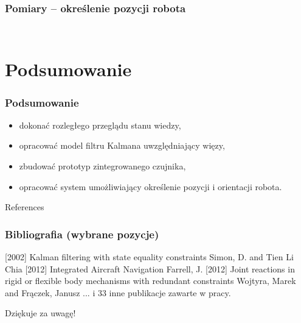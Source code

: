 \documentclass[aspectratio=169]{beamer}  %
\begin{document}
\begin{frame}
	\frametitle{Pomiary -- określenie pozycji robota \href{run:movies/position_test.mp4}{}}
	\begin{columns}
		\begin{column}{0.5\textwidth}
			\begin{figure}
				\centering
			\end{figure}
		\end{column}
		\begin{column}{0.5\textwidth}
			\begin{figure}
				\centering
			\end{figure}
		\end{column}
	\end{columns}
\end{frame}

\section{Podsumowanie}

\begin{frame}
	\frametitle{Podsumowanie}	
	\begin{itemize}
		\item<1-> dokonać rozległego przeglądu stanu wiedzy,
		\item<1-> opracować model filtru Kalmana uwzględniający więzy,
		\item<1-> zbudować prototyp zintegrowanego czujnika,
		\item<1-> opracować system umożliwiający określenie pozycji i orientacji robota.
	\end{itemize}
\end{frame}

\begin{frame}{References}
	\frametitle{Bibliografia (wybrane pozycje)}
	\begin{thebibliography}{10}
		\beamertemplatebookbibitems
		 Kalman filtering with state equality constraints
		\newblock Simon, D. and Tien Li Chia
		 Integrated Aircraft Navigation
		\newblock Farrell, J.
		 Joint reactions in rigid or flexible body mechanisms with redundant constraints
		\newblock Wojtyra, Marek and Frączek, Janusz
		 ... i 33 inne publikacje zawarte w pracy.
	\end{thebibliography}
\end{frame}

\begin{frame}
	  \begin{center}
	\Huge Dziękuje za uwagę!
	\end{center}
\end{frame}
\end{document}
